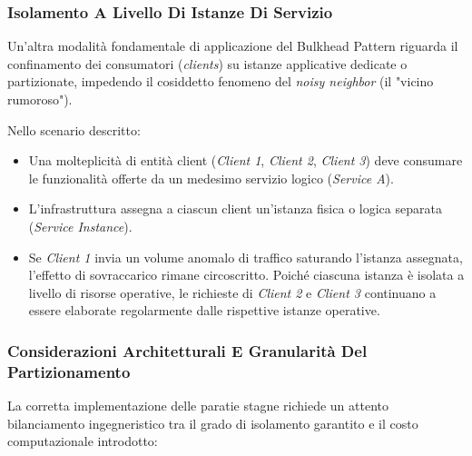 \documentclass[11pt, a4paper]{article}
\begin{document}
\subsubsection{Isolamento A Livello Di Istanze Di Servizio}

Un'altra modalità fondamentale di applicazione del Bulkhead Pattern riguarda il confinamento dei consumatori (\emph{clients}) su istanze applicative dedicate o partizionate, impedendo il cosiddetto fenomeno del \emph{noisy neighbor} (il "vicino rumoroso").


Nello scenario descritto:
\begin{itemize}[noitemsep]
    \item Una molteplicità di entità client (\emph{Client 1}, \emph{Client 2}, \emph{Client 3}) deve consumare le funzionalità offerte da un medesimo servizio logico (\emph{Service A}).
    \item L'infrastruttura assegna a ciascun client un'istanza fisica o logica separata (\emph{Service Instance}).
    \item Se \emph{Client 1} invia un volume anomalo di traffico saturando l'istanza assegnata, l'effetto di sovraccarico rimane circoscritto. Poiché ciascuna istanza è isolata a livello di risorse operative, le richieste di \emph{Client 2} e \emph{Client 3} continuano a essere elaborate regolarmente dalle rispettive istanze operative.
\end{itemize}

\subsubsection{Considerazioni Architetturali E Granularità Del Partizionamento}

La corretta implementazione delle paratie stagne richiede un attento bilanciamento ingegneristico tra il grado di isolamento garantito e il costo computazionale introdotto:
\end{document}
